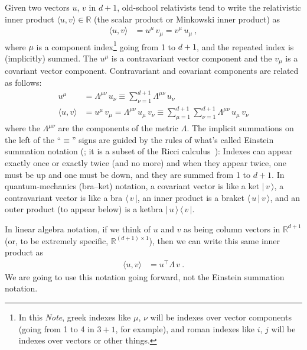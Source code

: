 \documentclass{article}
\newcommand{\inner}[2]{\langle{#1},{#2}\rangle}
\newcommand{\bra}[1]{\langle\,{#1}\,|}
\newcommand{\ket}[1]{|\,{#1}\,\rangle}
\newcommand{\braket}[2]{\langle\,{#1}\,|\,{#2}\,\rangle}
\newcommand{\ketbra}[2]{|\,{#1}\,\rangle\,\langle\,{#2}\,|}
\newcommand{\documentname}{\textsl{Note}}
\begin{document}
Given two vectors $u$, $v$ in $d+1$, old-school relativists tend to write the relativistic inner product $\inner{u}{v}\in\mathbb{R}$ (the scalar product or Minkowski inner product) as
\begin{align}
    \inner{u}{v} &= u^\mu\,v_\mu = v^\mu\,u_\mu ~,
\end{align}
where $\mu$ is a component index\footnote{In this \documentname{}, greek indexes like $\mu$, $\nu$ will be indexes over vector components (going from 1 to 4 in $3+1$, for example), and roman indexes like $i$, $j$ will be indexes over vectors or other things.} going from 1 to $d+1$, and the repeated index is (implicitly) summed.
The $u^\mu$ is a contravariant vector component and the $v_\mu$ is a covariant vector component.
Contravariant and covariant components are related as follows:
\begin{align}
    u^\mu &= \Lambda^{\mu\nu}\,u_\nu \equiv \sum_{\nu=1}^{d+1} \Lambda^{\mu\nu}\,u_\nu
    \\
    \inner{u}{v} &= u^\mu\,v_\mu = \Lambda^{\mu\nu}\,u_\mu\,v_\nu \equiv \sum_{\mu=1}^{d+1}\sum_{\nu=1}^{d+1} \Lambda^{\mu\nu}\,u_\mu\,v_\nu
\end{align}
where the $\Lambda^{\mu\nu}$ are the components of the metric $\Lambda$.
The implicit summations on the left of the ``$\equiv$'' signs are guided by the rules of what's called Einstein summation notation (\cite{summation}; it is a subset of the Ricci calculus~\cite{ricci}): Indexes can appear exactly once or exactly twice (and no more) and when they appear twice, one must be up and one must be down, and they are summed from 1 to $d+1$.
In quantum-mechanics (bra--ket) notation, a covariant vector is like a ket $\ket{v}$, a contravariant vector is like a bra $\bra{v}$,
an inner product is a braket $\braket{u}{v}$, and an outer product (to appear below) is a ketbra $\ketbra{u}{v}$.

In linear algebra notation, if we think of $u$ and $v$ as being column vectors in $\mathbb{R}^{d+1}$ (or, to be extremely specific, $\mathbb{R}^{(d+1)\times 1}$), then we can write this same inner product as
\begin{align}\label{eq:inner}
    \inner{u}{v} &= u^\top\Lambda\,v ~.
\end{align}
We are going to use this notation going forward, not the Einstein summation notation.
\end{document}
